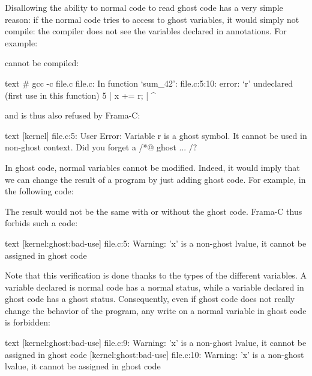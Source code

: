 Disallowing the ability to normal code to read ghost code has a very
simple reason: if the normal code tries to access to ghost variables,
it would simply not compile: the compiler does not see the variables
declared in annotations. For example:




cannot be compiled:


\begin{CodeBlock}{text}
# gcc -c file.c
file.c: In function ‘sum_42’:
file.c:5:10: error: ‘r’ undeclared (first use in this function)
    5 |     x += r;
      |          ^
\end{CodeBlock}


and is thus also refused by Frama-C:


\begin{CodeBlock}{text}
[kernel] file.c:5: User Error:
  Variable r is a ghost symbol. It cannot be used in non-ghost context. Did you forget a /*@ ghost ... /?
\end{CodeBlock}


In ghost code, normal variables cannot be modified. Indeed, it
would imply that we can change the result of a program by just
adding ghost code. For example, in the following code:




The result would not be the same with or without the ghost code.
Frama-C thus forbids such a code:


\begin{CodeBlock}{text}
[kernel:ghost:bad-use] file.c:5: Warning:
  'x' is a non-ghost lvalue, it cannot be assigned in ghost code
\end{CodeBlock}


Note that this verification is done thanks to the types of the different
variables. A variable declared is normal code has a normal status, while
a variable declared in ghost code has a ghost status. Consequently, even
if ghost code does not really change the behavior of the program, any
write on a normal variable in ghost code is forbidden:




\begin{CodeBlock}{text}
[kernel:ghost:bad-use] file.c:9: Warning:
  'x' is a non-ghost lvalue, it cannot be assigned in ghost code
[kernel:ghost:bad-use] file.c:10: Warning:
  'x' is a non-ghost lvalue, it cannot be assigned in ghost code
\end{CodeBlock}


